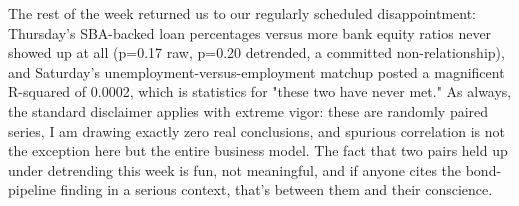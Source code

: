 The rest of the week returned us to our regularly scheduled disappointment: Thursday's SBA-backed loan percentages versus more bank equity ratios never showed up at all (p=0.17 raw, p=0.20 detrended, a committed non-relationship), and Saturday's unemployment-versus-employment matchup posted a magnificent R-squared of 0.0002, which is statistics for "these two have never met." As always, the standard disclaimer applies with extreme vigor: these are randomly paired series, I am drawing exactly zero real conclusions, and spurious correlation is not the exception here but the entire business model. The fact that two pairs held up under detrending this week is fun, not meaningful, and if anyone cites the bond-pipeline finding in a serious context, that's between them and their conscience.
